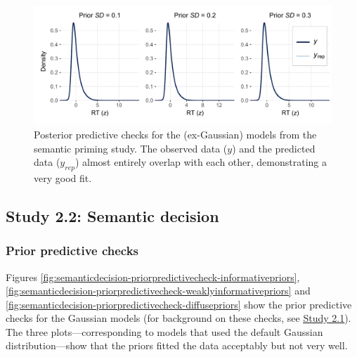 \documentclass[
  12pt,
  man,floatsintext]{apa7}
\begin{document}
\begin{figure}

{\centering \includegraphics[width=1\linewidth]{../semanticpriming/bayesian_analysis/posterior_predictive_checks/plots/semanticpriming_posteriorpredictivechecks_allpriors_exgaussian} 

}

\caption{Posterior predictive checks for the (ex-Gaussian) models from the semantic priming study. The observed data (\(y\)) and the predicted data (\(y_{rep}\)) almost entirely overlap with each other, demonstrating a very good fit.}\label{fig:semanticpriming-posteriorpredictivechecks-allpriors-exgaussian}
\end{figure}

\hypertarget{study-2.2-semantic-decision-3}{%
\subsection{Study 2.2: Semantic decision}\label{study-2.2-semantic-decision-3}}

\hypertarget{prior-predictive-checks-1}{%
\subsubsection{Prior predictive checks}\label{prior-predictive-checks-1}}

Figures \ref{fig:semanticdecision-priorpredictivecheck-informativepriors}, \ref{fig:semanticdecision-priorpredictivecheck-weaklyinformativepriors} and \ref{fig:semanticdecision-priorpredictivecheck-diffusepriors} show the prior predictive checks for the Gaussian models (for background on these checks, see \protect\hyperlink{study1-bayesian-diagnostics}{\underline{Study 2.1}}). The three plots---corresponding to models that used the default Gaussian distribution---show that the priors fitted the data acceptably but not very well.
\end{document}
